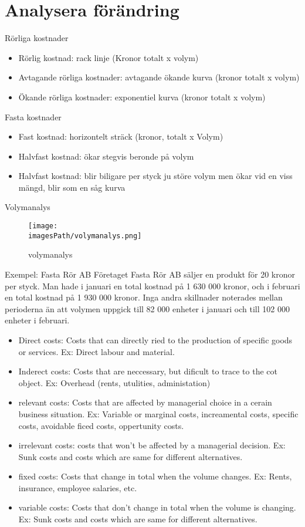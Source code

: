 \section{Analysera förändring}
Rörliga kostnader
\begin{itemize}
    \item Rörlig kostnad: rack linje (Kronor totalt x volym)
    \item Avtagande rörliga kostnader: avtagande ökande kurva (kronor totalt x volym)
    \item Ökande rörliga kostnader: exponentiel kurva (kronor totalt x volym)
\end{itemize}

Fasta kostnader 
\begin{itemize}
    \item Fast kostnad: horizontelt sträck (kronor, totalt x Volym)
    \item Halvfast kostnad: ökar stegvis beronde på volym
    \item Halvfast kostnad: blir biligare per styck ju störe volym men ökar vid en viss mängd, blir som en såg kurva
\end{itemize}

Volymanalys 
\begin{figure}[!h]
    \centering
    \texttt{[image: \\imagesPath/volymanalys.png]}
    \caption{volymanalys}
\end{figure}

\begin{exampleblock}{Exempel: Fasta Rör AB}
    Företaget Fasta Rör AB säljer en produkt för 20 kronor per styck. Man hade i januari en 
    total kostnad på 1 630 000 kronor, och i februari en total kostnad på 1 930 000 kronor. Inga 
    andra skillnader noterades mellan perioderna än att volymen uppgick till 82 000 enheter i januari 
    och till 102 000 enheter i februari.
\end{exampleblock}

\begin{itemize}
    \item Direct costs: Costs that can directly ried to the production of specific goods or services.
    Ex: Direct labour and material.
    \item Inderect costs: Costs that are neccessary, but dificult to trace to the cot object. 
    Ex: Overhead (rents, utulities, administation)
    \item relevant costs: Costs that are affected by managerial choice in a cerain business situation.
    Ex: Variable or marginal costs, increamental costs, specific costs, avoidable ficed costs, oppertunity costs.
    \item irrelevant costs: costs that won't be affected by a managerial decision.
    Ex: Sunk costs and costs which are same for different alternatives.
    \item fixed costs: Costs that change in total when the volume changes.
    Ex: Rents, insurance, employee salaries, etc.
    \item variable costs: Costs that don't change in total when the volume is changing.
    Ex: Sunk costs and costs which are same for different alternatives.
\end{itemize}

